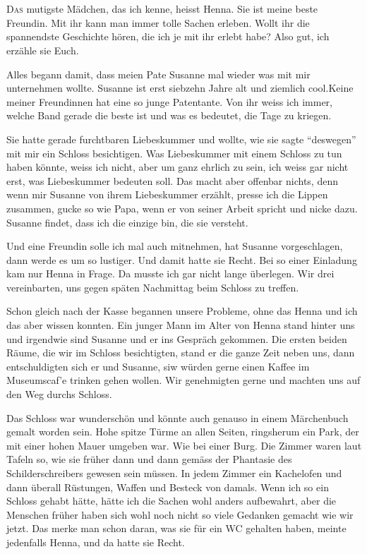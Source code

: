 \chapter*{}
\lettrine[lines=3]{\color{red}D}{as} mutigste Mädchen, das ich kenne, heisst Henna. Sie ist meine beste Freundin. Mit ihr kann man immer tolle Sachen erleben. Wollt ihr die spannendste Geschichte hören, die ich je mit ihr erlebt habe? Also gut, ich erzähle sie Euch.

Alles begann damit, dass meien Pate Susanne mal wieder was mit mir unternehmen wollte. Susanne ist erst siebzehn Jahre alt und ziemlich cool.Keine meiner Freundinnen hat eine so junge Patentante. Von ihr weiss ich immer, welche Band gerade die beste ist und was es bedeutet, die Tage zu kriegen.

Sie hatte gerade furchtbaren Liebeskummer und wollte, wie sie sagte \enquote{deswegen} mit mir ein Schloss besichtigen. Was Liebeskummer mit einem Schloss zu tun haben könnte, weiss ich nicht, aber um ganz ehrlich zu sein, ich weiss gar nicht erst, was Liebeskummer bedeuten soll. Das macht aber offenbar nichts, denn wenn mir Susanne von ihrem Liebeskummer erzählt, presse ich die Lippen zusammen, gucke so wie Papa, wenn er von seiner Arbeit spricht und nicke dazu. Susanne findet, dass ich die einzige bin, die sie versteht.

Und eine Freundin solle ich mal auch mitnehmen, hat Susanne vorgeschlagen, dann werde es um so lustiger. Und damit hatte sie Recht. Bei so einer Einladung kam nur Henna in Frage. Da musste ich gar nicht lange überlegen. Wir drei vereinbarten, uns gegen späten Nachmittag beim Schloss zu treffen.

Schon gleich nach der Kasse begannen unsere Probleme, ohne das Henna und ich das aber wissen konnten. Ein junger Mann im Alter von Henna stand hinter uns und irgendwie sind Susanne und er ins Gespräch gekommen. Die ersten beiden Räume, die wir im Schloss besichtigten, stand er die ganze Zeit neben uns, dann entschuldigten sich er und Susanne, siw würden gerne einen Kaffee im Museumscaf'e trinken gehen wollen. Wir genehmigten gerne und machten uns auf den Weg durchs Schloss.

Das Schloss war wunderschön und könnte auch genauso in einem Märchenbuch gemalt worden sein. Hohe spitze Türme an allen Seiten, ringsherum ein Park, der mit einer hohen Mauer umgeben war. Wie bei einer Burg. Die Zimmer waren laut Tafeln so, wie sie früher dann und dann gemäss der Phantasie des Schilderschreibers gewesen sein müssen. In jedem Zimmer ein Kachelofen und dann überall Rüstungen, Waffen und Besteck von damals. Wenn ich so ein Schloss gehabt hätte, hätte ich die Sachen wohl anders aufbewahrt, aber die Menschen früher haben sich wohl noch nicht so viele Gedanken gemacht wie wir jetzt. Das merke man schon daran, was sie für ein WC gehalten haben, meinte jedenfalls Henna, und da hatte sie Recht.

